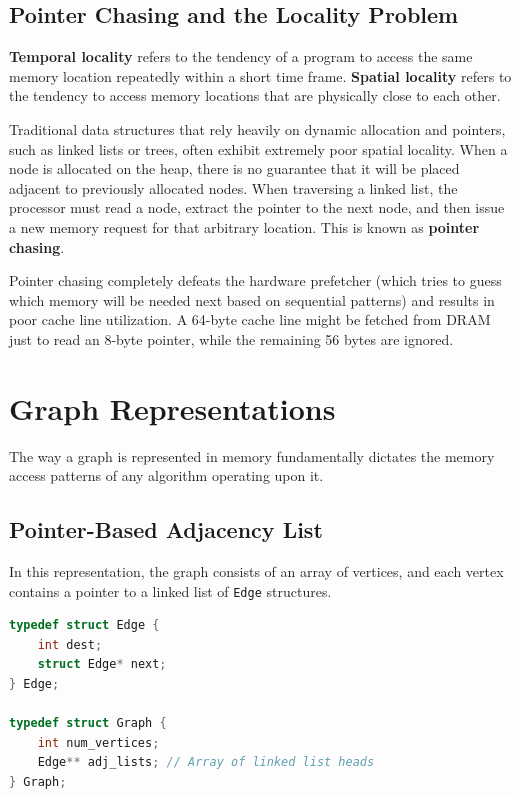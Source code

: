 \documentclass[11pt]{article}
\begin{document}
\subsection{Pointer Chasing and the Locality Problem}

\textbf{Temporal locality} refers to the tendency of a program to access the same memory location repeatedly within a short time frame. \textbf{Spatial locality} refers to the tendency to access memory locations that are physically close to each other.

Traditional data structures that rely heavily on dynamic allocation and pointers, such as linked lists or trees, often exhibit extremely poor spatial locality. When a node is allocated on the heap, there is no guarantee that it will be placed adjacent to previously allocated nodes. When traversing a linked list, the processor must read a node, extract the pointer to the next node, and then issue a new memory request for that arbitrary location. This is known as \textbf{pointer chasing}. 

Pointer chasing completely defeats the hardware prefetcher (which tries to guess which memory will be needed next based on sequential patterns) and results in poor cache line utilization. A 64-byte cache line might be fetched from DRAM just to read an 8-byte pointer, while the remaining 56 bytes are ignored.

\section{Graph Representations}

The way a graph is represented in memory fundamentally dictates the memory access patterns of any algorithm operating upon it.

\subsection{Pointer-Based Adjacency List}

In this representation, the graph consists of an array of vertices, and each vertex contains a pointer to a linked list of \texttt{Edge} structures.

\begin{lstlisting}[language=C, caption=Pointer-based Graph Structure]
typedef struct Edge {
    int dest;
    struct Edge* next;
} Edge;

typedef struct Graph {
    int num_vertices;
    Edge** adj_lists; // Array of linked list heads
} Graph;
\end{lstlisting}
\end{document}
